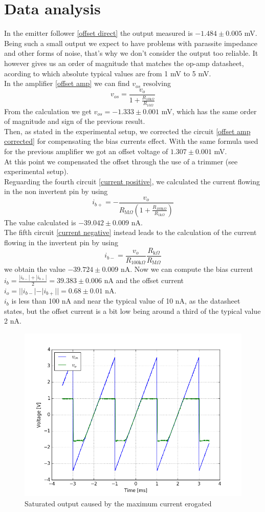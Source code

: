 \section{Data analysis}
In the emitter follower \eqref{offset direct} the output measured is $-1.484 \pm 0.005$ mV. Being such a small output we expect to have problems with parassite impedance and other forms of noise, that's why we don't consider the output too reliable. It however gives us an order of magnitude that matches the op-amp datasheet, acording to which absolute typical values are from 1 mV to 5 mV.\\
In the amplifier \eqref{offset amp} we can find $v_{os}$ resolving
\[v_{os} = \frac{v_{o}}{1 + \frac{R_{10\text{k}\Omega}}{R_{10\Omega}}}\]
From the calculation we get $v_{os} = -1.333 \pm 0.001$ mV, which has the same order of magnitude and sign of the previous result.\\
Then, as stated in the experimental setup, we corrected the circuit \eqref{offset amp corrected} for compensating the bias currents effect. With the same formula used for the previous amplifier we got an offset voltage of $1.307 \pm 0.001$ mV.\\
At this point we compensated the offset through the use of a trimmer (see experimental setup).\\
Reguarding the fourth circuit \eqref{current positive}, we calculated the current flowing in the non invertent pin by using $$i_{b+} = -\frac{v_{o}}{R_{\text{M}\Omega} (1 + \frac{R_{100\text{k}\Omega}}{R_{1\text{k}\Omega}})}$$ The value calculated is $-39.042 \pm 0.009$ nA.\\
The fifth circuit \eqref{current negative} instead leads to the calculation of the current flowing in the invertent pin by using 
\[i_{b-} = \frac{v_{o}}{R_{100\text{k}\Omega}} \frac{R_{\text{k}\Omega}}{R_{\text{M}\Omega}}\]
we obtain the value $-39.724 \pm 0.009$ nA. Now we can compute the bias current $i_b = \frac{|i_{b-}| + |i_{b+}|}{2} = 39.383 \pm 0.006$ nA and the offset current $i_o = ||i_{b-}| - |i_{b+}|| = 0.68 \pm 0.01$ nA.\\
$i_b$ is less than 100 nA and near the typical value of 10 nA, as the datasheet states, but the offset current is a bit low being around a third of the typical value 2 nA.\\
\begin{figure}[H]
\centering
\includegraphics[width=.6\textwidth]{3/Maximum_current_erogated.png}
\caption{Saturated output caused by the maximum current erogated}
\end{figure}
